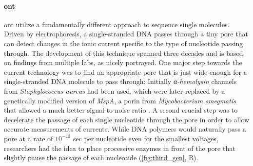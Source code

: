 

\paragraph{\acl{ont}}
\Acl{ont} utilize a fundamentally different approach to sequence single
molecules. Driven by electrophoresis, a single-stranded DNA passes through a
tiny pore that can detect changes in the ionic current specific to the type of
nucleotide passing through. The development of this technique spanned three
decades and is based on findings from multiple labs, as \citet{Deamer2016}
nicely portrayed. One major step towards the current technology was to find an
appropriate pore that is just wide enough for a single-stranded DNA molecule to
pass through: Initially \textit{α-hemolysin} channels from
\textit{Staphylococcus aureus} had been used, which were later replaced by a
genetically modified version of \textit{MspA}, a porin from
\textit{Mycobacterium smegmatis} that allowed a much better signal-to-noise
ratio \citep{Butler2008}. A second crucial step was to decelerate the passage of
each single nucleotide through the pore in order to allow accurate measurements
of currents. While DNA polymers would naturally pass a pore at a rate of $10^{-13}$ sec
per nucleotide even for the smallest voltages, researchers had the idea to place
processive enzymes in front of the pore that slightly pause the passage of each
nucleotide \citep{Deamer2016} (\cref{fig:third_gen}, B).

